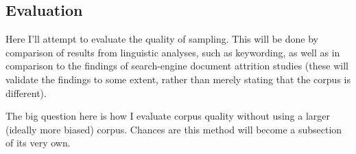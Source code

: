 \subsection{Evaluation}
Here  I'll attempt to evaluate the quality of sampling.  This will be done by comparison of results from linguistic analyses, such as keywording, as well as in comparison to the findings of search-engine document attrition studies (these will validate the findings to some extent, rather than merely stating that the corpus is different).

The big question here is how I evaluate corpus quality without using a larger (ideally more biased) corpus.  Chances are this method will become a subsection of its very own.
